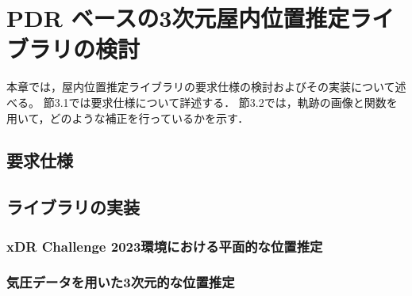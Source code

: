 
\chapter{PDR ベースの3次元屋内位置推定ライブラリの検討}
\thispagestyle{myheadings}
本章では，屋内位置推定ライブラリの要求仕様の検討およびその実装について述べる。
節3.1では要求仕様について詳述する．
節3.2では，軌跡の画像と関数を用いて，どのような補正を行っているかを示す．


\section{要求仕様}






\section{ライブラリの実装}


\subsection{xDR Challenge 2023環境における平面的な位置推定}











\subsection{気圧データを用いた3次元的な位置推定}



